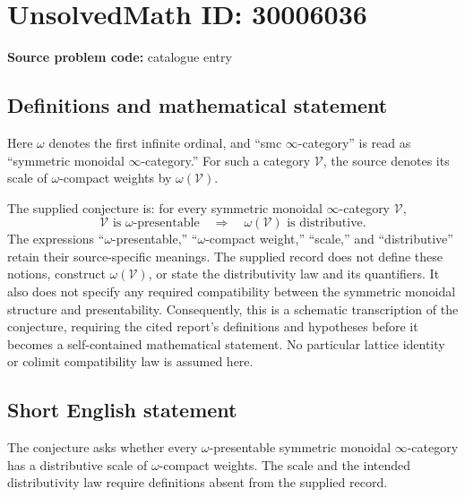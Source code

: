 \documentclass[11pt]{article}
\begin{document}
\section*{UnsolvedMath ID: 30006036}
\textbf{Source problem code:} catalogue entry
\subsection{Definitions and mathematical statement}
Here \(\omega\) denotes the first infinite ordinal, and ``smc \(\infty\)-category'' is read as ``symmetric monoidal \(\infty\)-category.'' For such a category \(\mathcal V\), the source denotes its scale of \(\omega\)-compact weights by \(\omega(\mathcal V)\).

The supplied conjecture is: for every symmetric monoidal \(\infty\)-category \(\mathcal V\),
\[
\mathcal V\text{ is }\omega\text{-presentable}
\quad\Longrightarrow\quad
\omega(\mathcal V)\text{ is distributive}.
\]
The expressions ``\(\omega\)-presentable,'' ``\(\omega\)-compact weight,'' ``scale,'' and ``distributive'' retain their source-specific meanings. The supplied record does not define these notions, construct \(\omega(\mathcal V)\), or state the distributivity law and its quantifiers. It also does not specify any required compatibility between the symmetric monoidal structure and presentability. Consequently, this is a schematic transcription of the conjecture, requiring the cited report's definitions and hypotheses before it becomes a self-contained mathematical statement. No particular lattice identity or colimit compatibility law is assumed here.
\subsection{Short English statement}
The conjecture asks whether every \(\omega\)-presentable symmetric monoidal \(\infty\)-category has a distributive scale of \(\omega\)-compact weights. The scale and the intended distributivity law require definitions absent from the supplied record.
\end{document}

